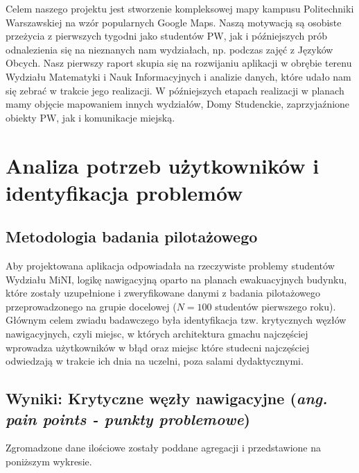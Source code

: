 \documentclass[14pt,a4paper]{extarticle}
\begin{document}
Celem naszego projektu jest stworzenie kompleksowej mapy kampusu Politechniki Warszawskiej na wzór popularnych Google Maps. Naszą motywacją są osobiste przeżycia z pierwszych tygodni jako studentów PW, jak i późniejszych prób odnalezienia się na nieznanych nam wydziałach, np. podczas zajęć z Języków Obcych. Nasz pierwszy raport skupia się na rozwijaniu aplikacji w obrębie terenu Wydziału Matematyki i Nauk Informacyjnych i analizie danych, które udało nam się zebrać w trakcie jego realizacji. W późniejszych etapach realizacji w planach mamy objęcie mapowaniem innych wydziałów, Domy Studenckie, zaprzyjaźnione obiekty PW, jak i komunikacje miejską.

\section{Analiza potrzeb użytkowników i identyfikacja problemów}

\subsection{Metodologia badania pilotażowego}

Aby projektowana aplikacja odpowiadała na rzeczywiste problemy studentów Wydziału MiNI, logikę nawigacyjną oparto na planach ewakuacyjnych budynku, które zostały uzupełnione i zweryfikowane danymi z badania pilotażowego przeprowadzonego na grupie docelowej ($N = 100$ studentów pierwszego roku). Głównym celem zwiadu badawczego była identyfikacja tzw. krytycznych węzłów nawigacyjnych, czyli miejsc, w których architektura gmachu najczęściej wprowadza użytkowników w błąd oraz miejsc które studecni najczęściej odwiedzają w trakcie ich dnia na uczelni, poza salami dydaktycznymi.

\subsection{Wyniki: Krytyczne węzły nawigacyjne (\textit{ang. pain points - punkty problemowe})}

Zgromadzone dane ilościowe zostały poddane agregacji i przedstawione na poniższym wykresie.
\end{document}
